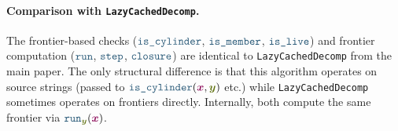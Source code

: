 \documentclass{article}
\theoremstyle{plain}
\newcommand{\srcStr}{\ensuremath{{\color{TokenColor}\boldsymbol{x}}}\xspace}
\newcommand{\tgtStr}{{\color{CharacterColor}\boldsymbol{y}}}
\newcommand{\myMintedFunc}[1]{\mbox{\texttt{{\color{StormBlue}#1}}}}
\newcommand{\continuous}[0]{\myMintedFunc{is\_cylinder}}
\newcommand{\discontinuous}[0]{\myMintedFunc{is\_member}}
\newcommand{\candidate}[0]{\myMintedFunc{is\_live}}
\newcommand{\runFrontier}[0]{\myMintedFunc{run}}
\newcommand{\nextFrontier}[0]{\myMintedFunc{step}}
\newcommand{\closureFrontier}[0]{\myMintedFunc{closure}}
\begin{document}
\paragraph{Comparison with \texttt{LazyCachedDecomp}.}
The frontier-based checks ($\continuous$, $\discontinuous$, $\candidate$) and
frontier computation ($\runFrontier$, $\nextFrontier$, $\closureFrontier$) are
identical to \texttt{LazyCachedDecomp} from the main paper.
The only structural difference is that this algorithm operates on source strings
(passed to $\continuous(\srcStr, \tgtStr)$ etc.) while
\texttt{LazyCachedDecomp} sometimes operates on frontiers directly.
Internally, both compute the same frontier via $\runFrontier_\tgtStr(\srcStr)$.
\end{document}
